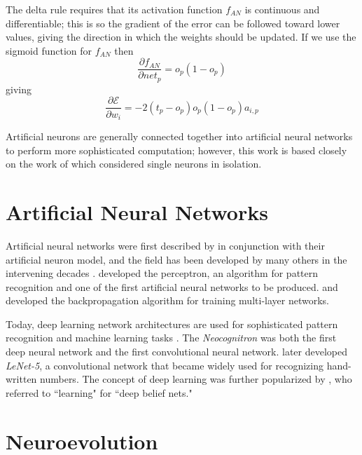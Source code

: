 \documentclass[master]{outhesis}
\begin{document}
The delta rule requires that its activation function $f_{AN}$ is continuous and differentiable;
this is so the gradient of the error can be followed toward lower values, giving the direction in which the weights should be updated.
If we use the sigmoid function for $f_{AN}$ then
\begin{displaymath}
\frac{\partial f_{AN}}{\partial net_p} = o_p(1 - o_p)
\end{displaymath}
giving
\begin{displaymath}
\frac{\partial \mathcal{E}}{\partial w_i} = -2(t_p - o_p)o_p(1 - o_p)a_{i,p}
\end{displaymath}

Artificial neurons are generally connected together into artificial neural networks to perform more sophisticated computation;
however, this work is based closely on the work of \citet{Chalmers:1990aa} which considered single neurons in isolation.

\section{Artificial Neural Networks}

Artificial neural networks were first described by \citet{McCulloch:1943aa} in conjunction with their artificial neuron model,
and the field has been developed by many others in the intervening decades \citep{Engelbrecht:2007aa}.
\citet{Rosenblatt:1958aa} developed the perceptron, an algorithm for pattern recognition and one of the first artificial neural networks to be produced.
\citet{Werbos:1975aa} and \cite{Rumelhart:1986aa} developed the backpropagation algorithm for training multi-layer networks.

Today, deep learning network architectures are used for sophisticated pattern recognition and machine learning tasks \citep{Schmidhuber:2015aa}.
The \emph{Neocognitron} \citep{Fukushima:1980aa} was both the first deep neural network and the first convolutional neural network.
\citet{LeCun:1998aa} later developed \emph{LeNet-5}, a convolutional network that became widely used for recognizing hand-written numbers.
The concept of deep learning was further popularized by \citet{Hinton:2006aa}, who referred to ``learning" for ``deep belief nets."

\section{Neuroevolution}
\end{document}
